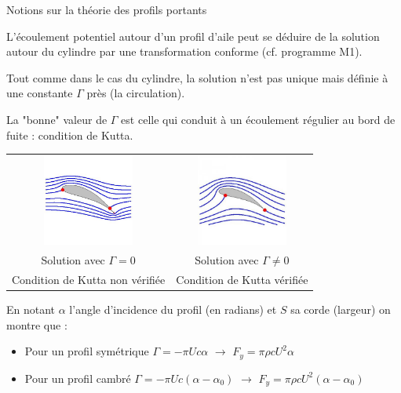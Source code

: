 \begin{frame}{Notions sur la théorie des profils portants}

\small
L'écoulement potentiel autour d'un profil d'aile peut se déduire de la solution autour du cylindre par une transformation conforme (cf. programme M1).

\smallskip
\pause
Tout comme dans le cas du cylindre, la solution n'est pas unique mais définie à une constante $\Gamma$ près (la circulation).

\smallskip
\pause
La "bonne" valeur de $\Gamma$ est celle qui conduit à un écoulement régulier au bord de fuite : condition de Kutta.

\pause
\begin{center}
\begin{tabular}{cc}
\includegraphics[width=30mm]{Figures/Joukowski.jpeg}
&
\includegraphics[width=30mm]{Figures/Joukowski_Kutta.jpeg}
\\
Solution avec $\Gamma = 0$ & Solution avec  $\Gamma \ne 0$ \\
Condition de Kutta non vérifiée & Condition de Kutta vérifiée
\end{tabular}
\end{center}

\pause
\smallskip
En notant $\alpha$ l'angle d'incidence du profil (en radians) et $S$ sa corde (largeur) on montre que :
\begin{itemize}
\item Pour un profil symétrique $\Gamma = - \pi U c \alpha $ \quad $\rightarrow$ \quad 
$F_y = \pi \rho c U^2   \alpha  $
\item Pour un profil cambré $\Gamma = - \pi U c (\alpha-\alpha_0) $ \quad $\rightarrow$ \quad 
$F_y = \pi \rho c U^2  (\alpha-\alpha_0)$

\end{itemize}
\end{frame}


